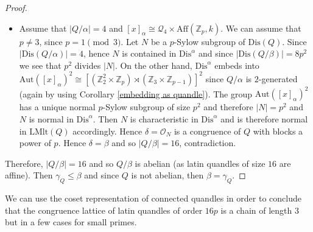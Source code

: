 \documentclass[a4paper, english, 9pt]{amsart}
\theoremstyle{plain}
\theoremstyle{definition}
\def\aut#1{\mathrm{Aut}(#1)}
\def\aff#1{\mathrm{Aff}#1}
\def\lmlt{\mathrm{LMlt}}
\def\dis{\mathrm{Dis}}
\def\Z{\mathbb Z}
\def\Ma{\mathcal Max}
\def\LSS{\mathcal{LSS}}
\begin{document}
\begin{proof}
\begin{itemize}
                \item Assume that $|Q/\alpha|=4$ and $[x]_\alpha\cong \mathcal{Q}_4\times \aff(\Z_p,k)$. %
                We can assume that $p\neq 3$, since $p=1\pmod{3}$. Let $N$ be a $p$-Sylow subgroup of $\dis(Q)$. Since $|\dis(Q/\alpha)|=4$, hence $N$ is contained in $\dis^\alpha$ and since $|\dis(Q/\beta)|=8p^2$ we see that $p^2$ divides $|N|$. On the other hand, $\dis^\alpha$ embeds into $\aut{[x]_\alpha}^2\cong [(\Z_2^2\times \Z_p)\rtimes (\Z_3\times \Z_{p-1})]^2$ since $Q/\alpha$ is $2$-generated (again by using Corollary \ref{embedding as quandle}). The group $\aut{[x]_\alpha}^2$ has a unique normal $p$-Sylow subgroup of size $p^2$ and therefore $|N|=p^2$ and $N$ is normal in $\dis^\alpha$. Then $N$ is characteristic in $\dis^\alpha$ and is therefore normal in $\lmlt(Q)$ accordingly. Hence $\delta=\mathcal{O}_N$ is a congruence of $Q$ with blocks a power of $p$. Hence $\delta=\beta$ and so $|Q/\beta|=16$, contradiction.  
        \end{itemize}
    Therefore, $|Q/\beta|=16$ and so $Q/\beta$ is abelian (as latin quandles of size $16$ are affine). Then $\gamma_Q\leq \beta$ and since $Q$ is not abelian, then $\beta=\gamma_Q$. 
%
%
%
%
\end{proof}



We can use the coset representation of connected quandles in order to conclude that the congruence lattice of latin quandles of order $16p$ is a chain of length $3$ but in a few cases for small primes. 
\end{document}
